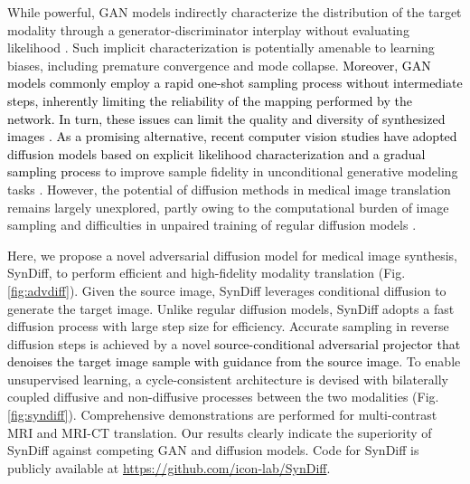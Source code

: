 \documentclass[journal,twoside,web]{ieeecolor}
\newcommand*{\revhl}{\textcolor{black}}
\begin{document}
While powerful, GAN models indirectly characterize the distribution of the target modality through a generator-discriminator interplay without evaluating likelihood \cite{pix2pix}. Such implicit characterization is potentially amenable to learning biases, including premature convergence and mode collapse. \revhl{Moreover, GAN models commonly employ a rapid one-shot sampling process without intermediate steps, inherently limiting the reliability of the mapping performed by the network. In turn, these issues can limit the quality and diversity of synthesized images \cite{DiffBeatsGAN}. As a promising alternative, recent computer vision studies have adopted diffusion models based on explicit likelihood characterization and a gradual sampling process} to improve sample fidelity in unconditional generative modeling tasks \cite{DDPM,DiffBeatsGAN}. However, the potential of diffusion methods in medical image translation remains largely unexplored, partly owing to the computational burden of image sampling and difficulties in unpaired training of regular diffusion models \cite{DDPM}. 



Here, we propose a novel adversarial diffusion model for medical image synthesis, SynDiff, to perform efficient and high-fidelity modality translation (Fig. \ref{fig:advdiff}). Given the source image, SynDiff leverages conditional diffusion to generate the target image. Unlike regular diffusion models, SynDiff adopts a fast diffusion process with large step size for efficiency. Accurate sampling in reverse diffusion steps is achieved by a novel \revhl{source-conditional adversarial projector that denoises the target image sample with guidance from the source image}. To enable unsupervised learning, a cycle-consistent architecture is devised with bilaterally coupled diffusive and non-diffusive processes between the two modalities (Fig. \ref{fig:syndiff}). Comprehensive demonstrations are performed for multi-contrast MRI and MRI-CT translation. Our results clearly indicate the superiority of SynDiff against competing GAN and diffusion models. Code for SynDiff is publicly available at \href{https://github.com/icon-lab/SynDiff}{https://github.com/icon-lab/SynDiff}. 
\end{document}
